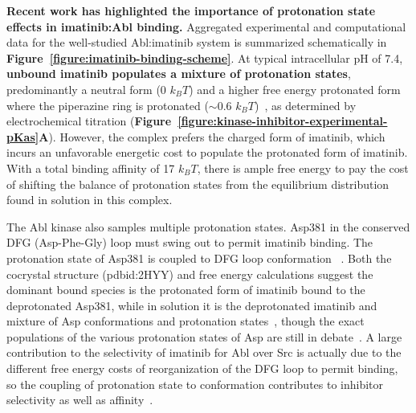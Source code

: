 \documentclass[11pt]{article}
\begin{document}
{\bf Recent work has highlighted the importance of protonation state effects in imatinib:Abl binding.}
Aggregated experimental and computational data for the well-studied Abl:imatinib system is summarized schematically in {\bf Figure~\ref{figure:imatinib-binding-scheme}}.
At typical intracellular pH of 7.4, {\bf unbound imatinib populates a mixture of protonation states}, predominantly a neutral form (0 $k_B T$) and a higher free energy protonated form where the piperazine ring is protonated ($\sim$0.6 $k_B T$)~\cite{szakacks:j-med-chem:2005:acid-base-profiling-of-imatinib}, as determined by electrochemical titration ({\bf Figure~\ref{figure:kinase-inhibitor-experimental-pKas}A}).  
However, the complex prefers the charged form of imatinib, which incurs an unfavorable energetic cost to populate the protonated form of imatinib.
With a total binding affinity of 17 $k_B T$, there is ample free energy to pay the cost of shifting the balance of protonation states from the equilibrium distribution found in solution in this complex. 

The Abl kinase also samples multiple protonation states.
Asp381 in the conserved DFG (Asp-Phe-Gly) loop  must swing out to permit imatinib binding.  
The protonation state of Asp381 is coupled to DFG loop conformation ~\cite{kuriyan-shaw:pnas:2009:abl-protonation-state}.
Both the cocrystal structure (pdbid:2HYY) and free energy calculations suggest the dominant bound species is the protonated form of imatinib bound to the deprotonated Asp381, while in solution it is the deprotonated imatinib and mixture of Asp conformations and protonation states~\cite{simonson:j-comput-chem:2010:imatinib-protonation-state,roux:pnas:2013:gleevec-selectivity}, though the exact populations of the various protonation states of Asp are still in debate~\cite{kuriyan-shaw:pnas:2009:abl-protonation-state}.
A large contribution to the selectivity of imatinib for Abl over Src is actually due to the different free energy costs of reorganization of the DFG loop to permit binding, so the coupling of protonation state to conformation contributes to inhibitor selectivity as well as affinity~\cite{seeliger:2007:structure:imatinib-binding,simonson:j-biol-chem:2010:imatinib-selectivity,roux:pnas:2013:gleevec-selectivity}.
\end{document}
